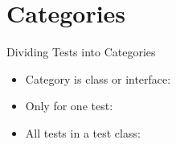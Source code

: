 {
\date{Piet Mondrian, Composition with Gray and Light Brown}
\part{Categories}
}

\begin{frame}{Dividing Tests into Categories}
	\begin{itemize}
		\item Category is class or interface:
		\item Only for one test:
		\item All tests in a test class:
	\end{itemize}
\end{frame}

